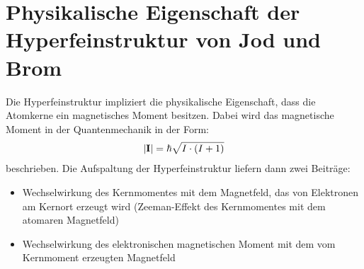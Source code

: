 
\section{Physikalische Eigenschaft der Hyperfeinstruktur von Jod und Brom}
\label{sec:hyperfeinstruktur}

Die Hyperfeinstruktur impliziert die physikalische Eigenschaft, dass die Atomkerne ein magnetisches Moment besitzen. Dabei wird das magnetische Moment in der Quantenmechanik in der Form:
\begin{gather}
    \abs{\boldsymbol{\mathbf{I}}} = \hbar \sqrt{I\cdot (I+1)}
\end{gather}
beschrieben. \cite{DemtroederKerne} Die Aufspaltung der Hyperfeinstruktur liefern dann zwei Beiträge:
\begin{itemize}
    \item Wechselwirkung des Kernmomentes mit dem Magnetfeld, das von Elektronen am Kernort erzeugt wird (Zeeman-Effekt des Kernmomentes mit dem atomaren Magnetfeld) \cite{DemtroederAtome}
    \item Wechselwirkung des elektronischen magnetischen Moment mit dem vom Kernmoment erzeugten Magnetfeld \cite{DemtroederAtome}
\end{itemize}
